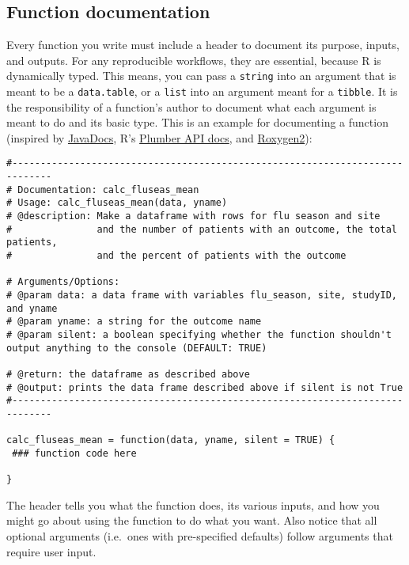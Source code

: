 \documentclass[
]{book}
\begin{document}
\hypertarget{function-documentation}{%
\subsection{Function documentation}\label{function-documentation}}

Every function you write must include a header to document its purpose, inputs, and outputs. For any reproducible workflows, they are essential, because R is dynamically typed. This means, you can pass a \texttt{string} into an argument that is meant to be a \texttt{data.table}, or a \texttt{list} into an argument meant for a \texttt{tibble}. It is the responsibility of a function's author to document what each argument is meant to do and its basic type. This is an example for documenting a function (inspired by \href{https://www.oracle.com/technetwork/java/javase/documentation/index-137868.html\#format}{JavaDocs}, R's \href{https://blog.rstudio.com/2018/10/23/rstudio-1-2-preview-plumber-integration/}{Plumber API docs}, and \href{https://kbroman.org/pkg_primer/pages/docs.html}{Roxygen2}):

\begin{verbatim}
#-----------------------------------------------------------------------------
# Documentation: calc_fluseas_mean
# Usage: calc_fluseas_mean(data, yname)
# @description: Make a dataframe with rows for flu season and site
#               and the number of patients with an outcome, the total patients,
#               and the percent of patients with the outcome

# Arguments/Options:
# @param data: a data frame with variables flu_season, site, studyID, and yname
# @param yname: a string for the outcome name
# @param silent: a boolean specifying whether the function shouldn't output anything to the console (DEFAULT: TRUE)

# @return: the dataframe as described above
# @output: prints the data frame described above if silent is not True
#-----------------------------------------------------------------------------

calc_fluseas_mean = function(data, yname, silent = TRUE) {
 ### function code here 

}
\end{verbatim}

The header tells you what the function does, its various inputs, and how you might go about using the function to do what you want. Also notice that all optional arguments (i.e.~ones with pre-specified defaults) follow arguments that require user input.
\end{document}
